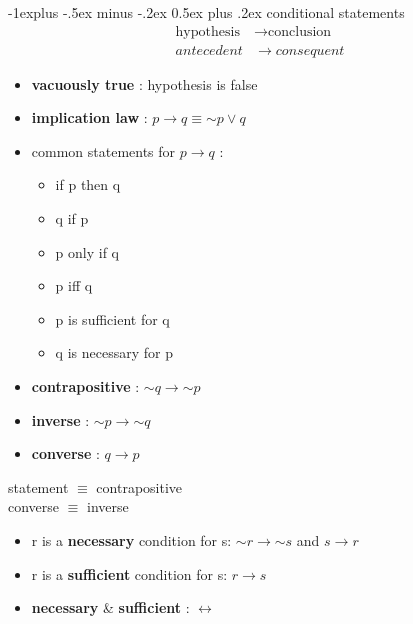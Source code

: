 \documentclass[10pt, landscape]{article}
\makeatletter
\renewcommand{\subsection}{\@startsection{subsection}{2}{0mm}%
                                {-1explus -.5ex minus -.2ex}%
                                {0.5ex plus .2ex}%
                                {\normalfont\normalsize\bfseries}}
\renewcommand{\lnot}{\mathord{\sim}}
\renewcommand{\bf}[1]{\textbf{#1}}
\let\iff\leftrightarrow
\let\then\rightarrow
\makeatother
\begin{document}
\begin{multicols}{4}
\subsection{conditional statements}
    \begin{equation*}
        \begin{split}
            \text{hypothesis} &\then \text{conclusion} \\
            antecedent &\then consequent
        \end{split}
    \end{equation*}

\begin{itemize}
    \item \textbf{vacuously true} : hypothesis is false
    \item \textbf{implication law} : $p \then q \equiv \lnot p \lor q$
    \item common statements for $p \then q$ :
    \begin{itemize}
        \item if p then q
        \item q if p
        \item p only if q
        \item p iff q
        \item p is sufficient for q
        \item q is necessary for p
    \end{itemize}
\end{itemize}

\begin{multicols}{2}
    \begin{itemize}
        \item \bf{contrapositive} : $\lnot q \then \lnot p$ 
        \item \bf{inverse} : $\lnot p \then \lnot q$ 
        \item \bf{converse} : $q \then p$ 
    \end{itemize} 
    \begin{center}
        statement $\equiv$ contrapositive 
        \\ converse $\equiv$ inverse 
    \end{center}
\end{multicols}
\begin{itemize}
    \item r is a \bf{necessary} condition for s: $\lnot r \then \lnot s$ and $s \then r$
    \item r is a \bf{sufficient} condition for s: $r \then s$
    \item \bf{necessary} \& \bf{sufficient} : $\iff$
\end{itemize}


\end{multicols}
\end{document}
